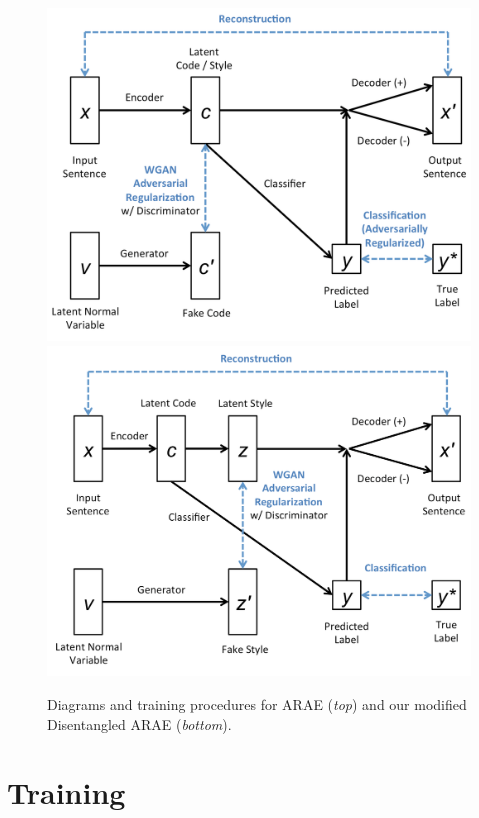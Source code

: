 \documentclass{article}
\begin{document}
            
\begin{figure}
  \centering
  \includegraphics[scale=0.15]{img/arae}
  \includegraphics[scale=0.15]{img/disentangled-arae}
  \caption{\label{fig:diagram} Diagrams and training procedures for ARAE (\emph{top}) and our modified Disentangled ARAE (\emph{bottom}).}
\end{figure}


\section{Training}
\end{document}
